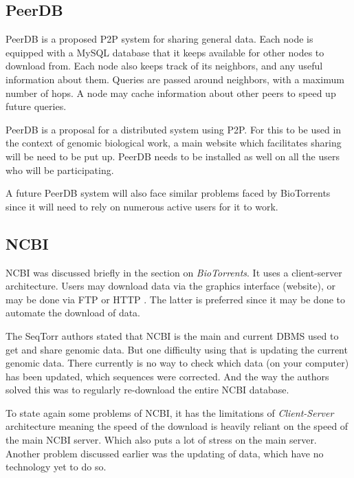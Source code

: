 \documentclass{article}
\begin{document}
\subsection{PeerDB}
PeerDB is a proposed P2P system for sharing general data. Each node is equipped with a MySQL database that it keeps available for other nodes to download from. Each node also keeps track of its neighbors, and any useful information about them. Queries are passed around neighbors, with a maximum number of hops. A node may cache information about other peers to speed up future queries.
\autocite{peerdb}

PeerDB is a proposal for a distributed system using P2P. For this to be used in the context of genomic biological work, a main website which facilitates sharing will be need to be put up. PeerDB needs to be installed as well on all the users who will be participating.

A future PeerDB system will also face similar problems faced by BioTorrents since it will need to rely on numerous active users for it to work.

\subsection{NCBI}
NCBI was discussed briefly in the section on \textit{BioTorrents}. It uses a client-server architecture. Users may download data via the graphics interface (website), or may be done via FTP or HTTP \autocite{biotorrents}. The latter is preferred since it may be done to automate the download of data.

The SeqTorr authors\autocite{seqtorr} stated that NCBI is the main and current DBMS used to get and share genomic data. But one difficulty using that is updating the current genomic data. There currently is no way to check which data (on your computer) has been updated, which sequences were corrected. And the way the authors solved this was to regularly re-download the entire NCBI database.

To state again some problems of NCBI, it has the limitations of \textit{Client-Server} architecture meaning the speed of the download is heavily reliant on the speed of the main NCBI server. Which also puts a lot of stress on the main server. Another problem discussed earlier was the updating of data, which have no technology yet to do so.

\end{document}
